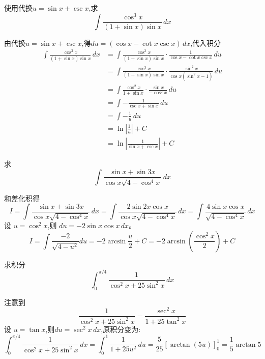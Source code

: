 \begin{questions}
    \question 使用代换$u = \sin x + \csc x$,求
    \[
    \int \frac{\cos^3 x}{(1+\sin x)\sin x} \, dx
    \]
    \begin{solution}
        由代换$u = \sin x + \csc x$,得$du = (\cos x - \cot x \csc x )\,dx$,代入积分
        \begin{align*}
        \int \frac{\cos^3 x}{(1+\sin x)\sin x} \, dx 
        &= \int \frac{\cos^3 x}{(1+\sin x)\sin x} \cdot \frac{1}{\cos x - \cot x \csc x} \, du \\
        &= \int \frac{\cos^3 x}{(1+\sin x)\sin x} \cdot \frac{\sin^2 x}{\cos x (\sin^2 x-1)} \, du \\
        &= \int \frac{\cos^2 x}{1+\sin x} \cdot \frac{\sin x}{-\cos^2 x} \, du \\
        &= \int -\frac{1}{\csc x + \sin x} \, du \\
        &= \int -\frac{1}{u} \, du \\
        &= \ln\left|\frac{1}{u}\right| + C \\
        &= \ln\left|\frac{1}{\sin x + \csc x}\right| + C 
        \end{align*}
    \end{solution}

    \question 求 
    \[
    \int \frac{\sin x + \sin 3x}{\cos x \sqrt{4 - \cos^4 x}} \,dx
    \]
    \begin{solution}
        和差化积得
        \[
        I=\int \frac{\sin x + \sin 3x}{\cos x \sqrt{4 - \cos^4 x}} \,dx 
        = \int \frac{2 \sin 2x \cos x}{\cos x \sqrt{4 - \cos^4 x}} \,dx 
        = \int \frac{4 \sin x \cos x}{\sqrt{4 - \cos^4 x}} \,dx 
        \]
        设 $u = \cos^2 x$,则 $du = -2 \sin x \cos x \,dx$。
        \[
        I = \int \frac{-2}{\sqrt{4 - u^2}} du
        = -2 \arcsin \frac{u}{2} + C 
        = -2 \arcsin \left(\frac{\cos^2 x}{2}\right) + C
        \]
    \end{solution}

    \question 求积分
    \[
    \int_{0}^{\pi/4} \frac{1}{\cos^2 x + 25\sin^2 x} \, dx
    \]
    \begin{solution}
        注意到
        \[
        \frac{1}{\cos^2 x + 25\sin^2 x} = \frac{\sec^2 x}{1 + 25\tan^2 x}
        \]
        设 $u = \tan x$,则$du = \sec^2 x \, dx$,原积分变为:
        \[
        \int_{0}^{\pi/4} \frac{1}{\cos^2 x + 25\sin^2 x} \, dx
        = \int_{0}^{1} \frac{1}{1 + 25u^2} \, du
        = \frac{5}{25}\left[ \arctan(5u) \right]_{0}^{1} = \frac{1}{5} \arctan 5
        \]
    \end{solution}


\end{questions}
